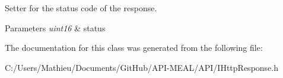 Setter for the status code of the response. 


\begin{DoxyParams}{Parameters}
{\em uint16} & status \\
\hline
\end{DoxyParams}


The documentation for this class was generated from the following file\+:\begin{DoxyCompactItemize}
\item 
C\+:/\+Users/\+Mathieu/\+Documents/\+Git\+Hub/\+A\+P\+I-\/\+M\+E\+A\+L/\+A\+P\+I/I\+Http\+Response.\+h\end{DoxyCompactItemize}
